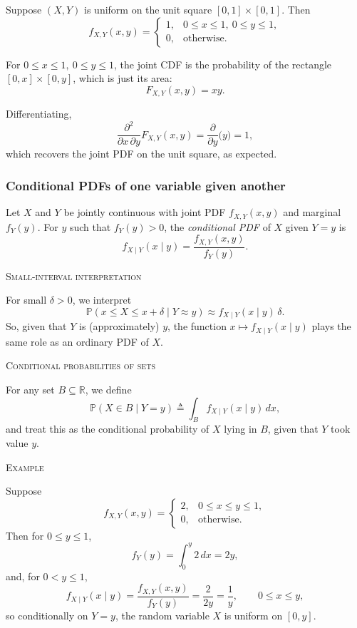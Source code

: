 Suppose \((X,Y)\) is uniform on the unit square \([0,1]\times[0,1]\).  
Then
\[
f_{X,Y}(x,y)
=
\begin{cases}
1, & 0 \le x \le 1,\ 0 \le y \le 1,\\
0, & \text{otherwise}.
\end{cases}
\]

For \(0 \le x \le 1,\ 0 \le y \le 1\), the joint CDF is the probability of the rectangle \([0,x]\times[0,y]\), which is just its area:
\[
F_{X,Y}(x,y) = xy.
\]

Differentiating,
\[
\frac{\partial^2}{\partial x\,\partial y}F_{X,Y}(x,y)
=
\frac{\partial}{\partial y}\big(y\big)
=
1,
\]
which recovers the joint PDF on the unit square, as expected.




\subsubsection{Conditional PDFs of one variable given another}

Let \(X\) and \(Y\) be jointly continuous with joint PDF \(f_{X,Y}(x,y)\) and marginal \(f_Y(y)\).  
For \(y\) such that \(f_Y(y) > 0\), the \textit{conditional PDF} of \(X\) given \(Y=y\) is
\[
f_{X\mid Y}(x\mid y)
=
\frac{f_{X,Y}(x,y)}{f_Y(y)}.
\]

\textsc{Small-interval interpretation}

For small \(\delta > 0\), we interpret
\[
\mathbb{P}(x \le X \le x + \delta \mid Y \approx y)
\approx
f_{X\mid Y}(x\mid y)\,\delta.
\]
So, given that \(Y\) is (approximately) \(y\), the function \(x \mapsto f_{X\mid Y}(x\mid y)\) plays the same role as an ordinary PDF of \(X\).

\textsc{Conditional probabilities of sets}

For any set \(B \subseteq \mathbb{R}\), we define
\[
\mathbb{P}(X \in B \mid Y = y)
\triangleq
\int_B f_{X\mid Y}(x\mid y)\,dx,
\]
and treat this as the conditional probability of \(X\) lying in \(B\), given that \(Y\) took value \(y\).

\textsc{Example}

Suppose
\[
f_{X,Y}(x,y)
=
\begin{cases}
2, & 0 \le x \le y \le 1,\\
0, & \text{otherwise}.
\end{cases}
\]
Then for \(0 \le y \le 1\),
\[
f_Y(y)
=
\int_0^y 2\,dx
=
2y,
\]
and, for \(0<y\le 1\),
\[
f_{X\mid Y}(x\mid y)
=
\frac{f_{X,Y}(x,y)}{f_Y(y)}
=
\frac{2}{2y}
=
\frac{1}{y},
\qquad 0 \le x \le y,
\]
so conditionally on \(Y=y\), the random variable \(X\) is uniform on \([0,y]\).


